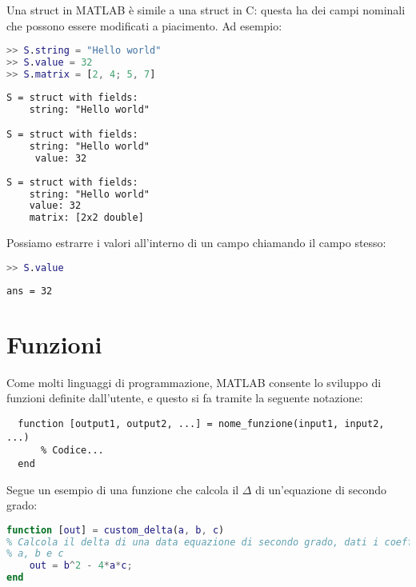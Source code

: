 Una struct in MATLAB è simile a una struct in C: questa ha dei campi nominali che possono essere modificati a piacimento. Ad esempio:

\begin{terminal}
    \begin{lstlisting}[language=MATLAB, style=notexterm]
>> S.string = "Hello world"
>> S.value = 32
>> S.matrix = [2, 4; 5, 7]\end{lstlisting}
    \tcblower
    \begin{lstlisting}[style=notexterm, language = tex]
S = struct with fields:
    string: "Hello world"

S = struct with fields:
    string: "Hello world"
     value: 32
    
S = struct with fields:
    string: "Hello world"
    value: 32
    matrix: [2x2 double]\end{lstlisting}
\end{terminal}

Possiamo estrarre i valori all'interno di un campo chiamando il campo stesso:

\begin{terminal}
    \begin{lstlisting}[language=MATLAB, style=notexterm]
>> S.value\end{lstlisting}
    \tcblower
    \begin{lstlisting}[style=notexterm, language = tex]
ans = 32\end{lstlisting}
\end{terminal}

\section{Funzioni}

Come molti linguaggi di programmazione, MATLAB consente lo sviluppo di funzioni definite dall'utente, e questo si fa tramite la seguente notazione:

\begin{verbatim}
  function [output1, output2, ...] = nome_funzione(input1, input2, ...)
      % Codice...
  end
\end{verbatim}

Segue un esempio di una funzione che calcola il $\Delta$ di un'equazione di secondo grado:

\begin{terminal}
    \begin{lstlisting}[language=MATLAB, style=notexterm]
function [out] = custom_delta(a, b, c)
% Calcola il delta di una data equazione di secondo grado, dati i coefficienti
% a, b e c
    out = b^2 - 4*a*c;
end\end{lstlisting}
\end{terminal}

